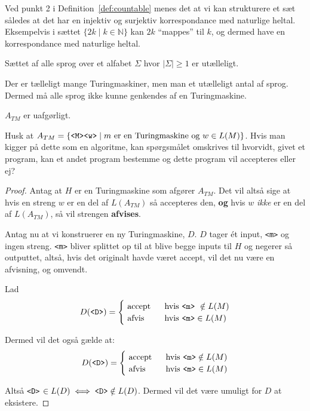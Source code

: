 Ved punkt 2 i Definition~\ref{def:countable} menes det at vi kan strukturere et sæt således at det har en injektiv og surjektiv korrespondance med naturlige heltal. Eksempelvis i sættet $\{2k \mid k \in \mathbb{N}\}$ kan $2k$ ``mappes'' til $k$, og dermed have en korrespondance med naturlige heltal.


\begin{corollary}
	Sættet af alle sprog over et alfabet $\Sigma$ hvor $|\Sigma| \ge 1$ er utælleligt.
\end{corollary}


Der er tælleligt mange Turingmaskiner, men man et utælleligt antal af sprog. Dermed må alle sprog ikke kunne genkendes af en Turingmaskine.

\begin{theorem}
  \label{teo:atmundecidable}
	$A_{TM}$ er uafgørligt.
\end{theorem}

Husk at $A_{TM} = \{\text{\texttt{<M><w>}} \mid m \text{ er en Turingmaskine og } w \in L(M)\}$. Hvis man kigger på dette som en algoritme, kan spørgsmålet omskrives til hvorvidt, givet et program, kan et andet program bestemme og dette program vil accepteres eller ej?

\begin{proof}
	Antag at $H$ er en Turingmaskine som afgører $A_{TM}$. Det vil altså sige at hvis en streng $w$ er en del af $L(A_{TM})$ så accepteres den, \textbf{og} hvis $w$ \textit{ikke} er en del af $L(A_{TM})$, så vil strengen \textbf{afvises}.

	Antag nu at vi konstruerer en ny Turingmaskine, $D$. $D$ tager ét input, \texttt{<m>} og ingen streng. \texttt{<m>} bliver splittet op til at blive begge inputs til $H$ og negerer så outputtet, altså, hvis det originalt havde været accept, vil det nu være en afvisning, og omvendt.

	Lad \begin{equation*}
		D(\text{\texttt{<D>}}) =
		\begin{cases}
			\text{ accept } & \text{ hvis \texttt{<m>} } \notin L(M) \\
			\text{ afvis}   & \text{ hvis \texttt{<m>}}  \in L(M)
		\end{cases}
	\end{equation*}

	Dermed vil det også gælde at:
	\begin{equation*}
		D(\text{\texttt{<D>}}) = \begin{cases}
			\text{ accept } & \text{ hvis \texttt{<m>}}  \notin L(M) \\
			\text{ afvis }  & \text{ hvis \texttt{<m>}} \in L(M)
		\end{cases}
	\end{equation*}

	Altså \texttt{<D>} $\in L(D) \iff \text{\texttt{<D>}} \notin L(D)$.
	Dermed vil det være umuligt for $D$ at eksistere.
\end{proof}

